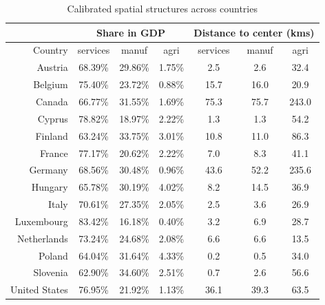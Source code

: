 \documentclass[12pt]{article}
\begin{document}
\begin{table}[htbp]
  \centering
  \caption{Calibrated spatial structures across countries}
    \begin{tabular}{rcccccc}
    \toprule
          & \multicolumn{3}{c}{Share in GDP} & \multicolumn{3}{c}{Distance to center (kms)} \\
    \midrule
    Country & services & manuf & agri  & services & manuf & agri \\
    Austria & 68.39\% & 29.86\% & 1.75\% & 2.5   & 2.6   & 32.4 \\
    Belgium & 75.40\% & 23.72\% & 0.88\% & 15.7  & 16.0  & 20.9 \\
    Canada & 66.77\% & 31.55\% & 1.69\% & 75.3  & 75.7  & 243.0 \\
    Cyprus & 78.82\% & 18.97\% & 2.22\% & 1.3   & 1.3   & 54.2 \\
    Finland & 63.24\% & 33.75\% & 3.01\% & 10.8  & 11.0  & 86.3 \\
    France & 77.17\% & 20.62\% & 2.22\% & 7.0   & 8.3   & 41.1 \\
    Germany & 68.56\% & 30.48\% & 0.96\% & 43.6  & 52.2  & 235.6 \\
    Hungary & 65.78\% & 30.19\% & 4.02\% & 8.2   & 14.5  & 36.9 \\
    Italy & 70.61\% & 27.35\% & 2.05\% & 2.5   & 3.6   & 26.9 \\
    Luxembourg & 83.42\% & 16.18\% & 0.40\% & 3.2   & 6.9   & 28.7 \\
    Netherlands & 73.24\% & 24.68\% & 2.08\% & 6.6   & 6.6   & 13.5 \\
    Poland & 64.04\% & 31.64\% & 4.33\% & 0.2   & 0.5   & 34.0 \\
    Slovenia & 62.90\% & 34.60\% & 2.51\% & 0.7   & 2.6   & 56.6 \\
    United States & 76.95\% & 21.92\% & 1.13\% & 36.1  & 39.3  & 63.5 \\
    \bottomrule
    \end{tabular}%
  \label{tab:share_dist}%
\end{table}%
\end{document}
